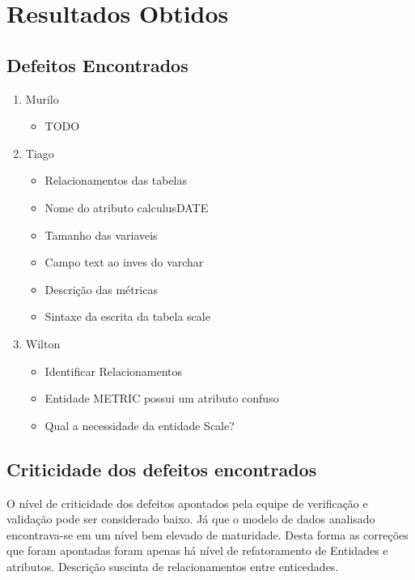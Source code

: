 \chapter[Resultados Obtidos]{Resultados Obtidos}

\section{Defeitos Encontrados}

\begin{enumerate}
  \item Murilo
  \begin{itemize}
    \item TODO
  \end{itemize}
  \item Tiago
  \begin{itemize}
    \item Relacionamentos das tabelas
    \item Nome do atributo calculusDATE
    \item Tamanho das variaveis
    \item Campo text ao inves do varchar
    \item Descrição das métricas
    \item Sintaxe da escrita da tabela  scale
  \end{itemize}
  \item Wilton
  \begin{itemize}
    \item Identificar Relacionamentos
    \item Entidade METRIC possui um atributo confuso
    \item Qual a necessidade da entidade Scale?

  \end{itemize}
\end{enumerate}

\section{Criticidade dos defeitos encontrados}

O nível de criticidade dos defeitos apontados pela equipe de verificação e validação pode ser
considerado baixo. Já que o modelo de dados analisado encontrava-se em um nível bem elevado de maturidade.
Desta forma as correções que foram apontadas foram apenas há nível de refatoramento de Entidades e atributos.
Descrição suscinta de relacionamentos entre enticedades.

